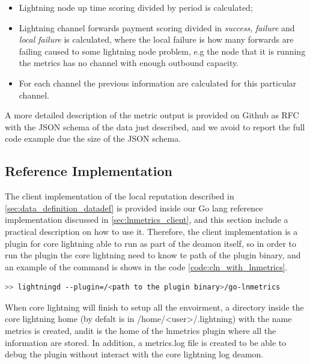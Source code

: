 \begin{itemize}
    \item Lightning node up time scoring divided by period is calculated;
    \item Lightning channel forwards payment scoring divided in \emph{success}, \emph{failure} and \emph{local failure}
        is calculated, where the local failure is how many forwards are failing caused to some lightning node problem,
        e.g the node that it is running the metrics has no channel with enough outbound capacity. 
    \item For each channel the previous information are calculated for this particular channel.
\end{itemize}

A more detailed description of the metric output is provided on Github as RFC with the JSON schema 
of the data just described, and we avoid to report the full code example due the size of the 
JSON schema. 

\subsection{Reference Implementation}

The client implementation of the local reputation described in \ref{sec:data_definition_datadef} 
is provided inside our Go lang reference implementation discussed in \ref{sec:lnmetrics_client},
and this section include a practical description on how to use it.
Therefore, the client implementation is a plugin for core lightning able to 
run as part of the deamon itself, so in order to run the plugin the core lightning
need to know te path of the plugin binary, and an example of the command is shows in
the code \ref{code:cln_with_lnmetrics}.

\begin{lstlisting}[language=bash, basicstyle=\small,
                  caption={Command to run the core lightning deamon with the lnmetrics plugin enabled.}, 
                  label={code:cln_with_lnmetrics}]
>> lightningd --plugin=/<path to the plugin binary>/go-lnmetrics
\end{lstlisting}

When core lightning will finish to setup all the envoirment, a directory inside 
the core lightning home (by defalt is in /home/<user>/.lightning) 
with the name metrics is created, andit is the home of the lnmetrics 
plugin where all the information are stored. In addition, a metrics.log file 
is created to be able to debug the plugin without interact with the 
core lightning log deamon.

